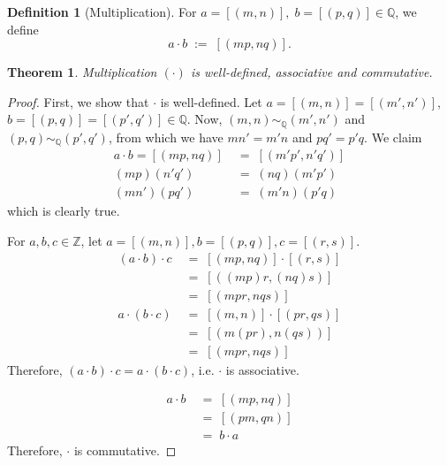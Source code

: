 \documentclass[10pt]{article}
\newtheorem{theorem}{Theorem}[section]
\theoremstyle{definition}
\newtheorem*{definition}{Definition}
\theoremstyle{remark}
\newcommand{\Z}{\mathbb{Z}}
\newcommand{\Q}{\mathbb{Q}}
\newcommand{\simQ}{\sim_{\Q}}
\begin{document}
        \begin{definition}[Multiplication]
        For $a = [(m, n)],\; b = [(p, q)] \in \Q$, we define
        \[
                a \cdot b \;:=\; [(mp, nq)].
        \]
        \end{definition}
        \begin{theorem}
                Multiplication $(\cdot)$ is well-defined, associative and commutative.
        \end{theorem}
        \begin{proof}
                First, we show that $\cdot$ is well-defined.
                Let $a = [(m, n)] = [(m', n')]$, $b = [(p, q)] = [(p', q')] \in \Q$.
                Now, $(m, n) \simQ (m', n')$ and $(p, q) \simQ (p', q')$, from which we have
                $mn' = m'n$ and $pq' = p'q$.
                We claim
                \begin{align*}
                        a\cdot b = [(mp, nq)] \;&=\; [(m'p', n'q')] \\
                                (mp)(n'q') \;&=\; (nq)(m'p') \\
                                (mn')(pq') \;&=\; (m'n)(p'q)
                \end{align*}
                which is clearly true.

                For $a,b,c \in \Z$, let $a = [(m, n)], b = [(p, q)], c = [(r, s)]$.
                \begin{align*}
                        (a\cdot b)\cdot c \;&=\; [(mp, nq)] \cdot [(r, s)] \\
                                \;&=\; [((mp)r, (nq)s)]\\
                                \;&=\; [(mpr, nqs)]\\
                        a\cdot (b\cdot c) \;&=\; [(m, n)] \cdot [(pr, qs)] \\
                                \;&=\; [(m(pr), n(qs))] \\
                                \;&=\; [(mpr, nqs)]
                \end{align*}
                Therefore, $(a\cdot b)\cdot c = a\cdot (b\cdot c)$, i.e. $\cdot$ is associative.
                
                \begin{align*}
                        a\cdot b \;&=\; [(mp, nq)] \\
                                \;&=\; [(pm, qn)] \\
                                \;&=\; b\cdot a
                \end{align*}
                Therefore, $\cdot$ is commutative.
        \end{proof}
\end{document}
